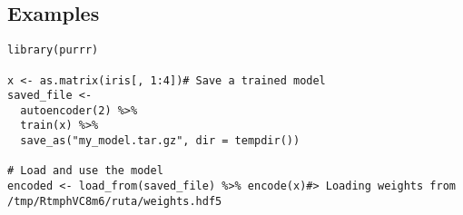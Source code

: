 \hypertarget{examples}{\subsection{\texorpdfstring{\protect\hyperlink{examples}{}Examples}{Examples}}\label{examples}}

\begin{verbatim}
library(purrr)

x <- as.matrix(iris[, 1:4])# Save a trained model
saved_file <-
  autoencoder(2) %>%
  train(x) %>%
  save_as("my_model.tar.gz", dir = tempdir())

# Load and use the model
encoded <- load_from(saved_file) %>% encode(x)#> Loading weights from /tmp/RtmphVC8m6/ruta/weights.hdf5
\end{verbatim}
